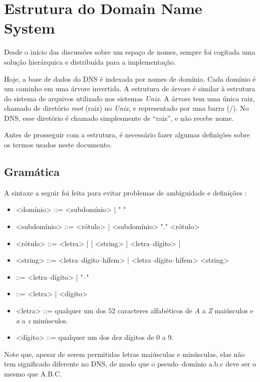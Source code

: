 \chapter{Estrutura do Domain Name System}

Desde o início das discussões sobre um espaço de nomes, sempre foi
cogitada uma solução hierárquica e distribuída \cite{rfc1034} para a
implementação.

Hoje, a base de dados do DNS é indexada por nomes de domínio. Cada
domínio é um caminho em uma árvore invertida. A estrutura de árvore é
similar à estrutura do sistema de arquivos utilizado nos sistemas
\textit{Unix}. A árvore tem uma única raiz, chamado de diretório
\textit{root} (raiz) no \textit{Unix}, e representado por uma barra
(/). No DNS, esse diretório é chamado simplesmente de ``raiz'', e não
recebe nome.

Antes de prosseguir com a estrutura, é necessário fazer algumas
definições sobre os termos usados neste documento.

\section{Gramática}

A sintaxe a seguir foi feita para evitar problemas de ambiguidade e
definições \cite{rfc1035}:

\begin{itemize}
\item <domínio> ::= <subdomínio> | " "
\item <subdomínio> ::= <rótulo> | <subdomínio> "." <rótulo>
\item <rótulo> ::= <letra> [ [ <string> ] <letra--dígito> ]
\item <string> ::= <letra--dígito--hífem> | <letra--dígito--hífem> <string>
\item <letra--dígito--hífem> ::= <letra--dígito> | "--"
\item <letra--dígito> ::= <letra> | <dígito>
\item <letra> ::= qualquer um dos 52 caracteres alfabéticos de
  \emph{A} a \emph{Z} maiúsculos e \emph{a} a \emph{z} minúsculos.
\item <dígito> ::= qualquer um dos dez dígitos de 0 a 9.
\end{itemize}

Note que, apesar de serem permitidas letras maiúsculas e minúsculas,
elas não tem significado diferente no DNS, de modo que o pseudo--domínio
a.b.c deve ser o mesmo que A.B.C.


